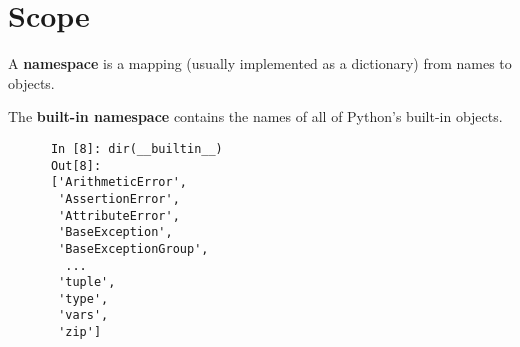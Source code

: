 \section{Scope}

  \begin{definition}[Namespace]
    A \textbf{namespace} is a mapping (usually implemented as a dictionary) from names to objects. 
  \end{definition}

  \begin{example}
    The \textbf{built-in namespace} contains the names of all of Python's built-in objects. 
    \begin{lstlisting}
      In [8]: dir(__builtin__)
      Out[8]: 
      ['ArithmeticError',
       'AssertionError',
       'AttributeError',
       'BaseException',
       'BaseExceptionGroup',
        ...
       'tuple',
       'type',
       'vars',
       'zip']
    \end{lstlisting}
  \end{example}

